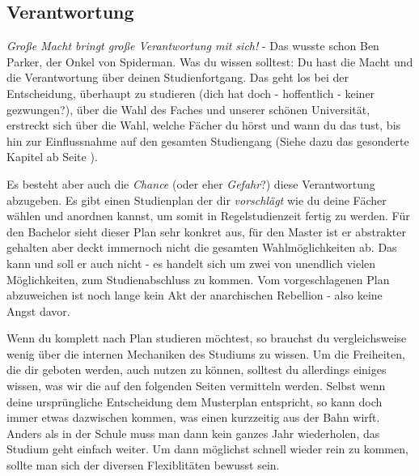 \subsection{Verantwortung}
\textit{Große Macht bringt große Verantwortung mit sich!} - Das wusste schon Ben Parker, der Onkel von Spiderman. Was du wissen solltest: Du hast die Macht und die Verantwortung über deinen Studienfortgang. Das geht los bei der Entscheidung, überhaupt zu studieren (dich hat doch - hoffentlich - keiner gezwungen?), über die Wahl des Faches und unserer schönen Universität, erstreckt sich über die Wahl, welche Fächer du hörst und wann du das tust, bis hin zur Einflussnahme auf den gesamten Studiengang (Siehe dazu das gesonderte Kapitel ab Seite \pageref{politik}).

Es besteht aber auch die \textit{Chance} (oder eher \textit{Gefahr}?) diese Verantwortung abzugeben. Es gibt einen Studienplan der dir \textit{vorschlägt} wie du deine Fächer wählen und anordnen kannst, um somit in Regelstudienzeit fertig zu werden. Für den Bachelor sieht dieser Plan sehr konkret aus, für den Master ist er abstrakter gehalten aber deckt immernoch nicht die gesamten Wahlmöglichkeiten ab. Das kann und soll er auch nicht - es handelt sich um zwei von unendlich vielen Möglichkeiten, zum Studienabschluss zu kommen. Vom vorgeschlagenen Plan abzuweichen ist noch lange kein Akt der anarchischen Rebellion - also keine Angst davor.

Wenn du komplett nach Plan studieren möchtest, so brauchst du vergleichsweise wenig über die internen Mechaniken des Studiums zu wissen. Um die Freiheiten, die dir geboten werden, auch nutzen zu können, solltest du allerdings einiges wissen, was wir die auf den folgenden Seiten vermitteln werden. Selbst wenn deine ursprüngliche Entscheidung dem Musterplan entspricht, so kann doch immer etwas dazwischen kommen, was einen kurzzeitig aus der Bahn wirft. Anders als in der Schule muss man dann kein ganzes Jahr wiederholen, das Studium geht einfach weiter. Um dann möglichst schnell wieder rein zu kommen, sollte man sich der diversen Flexiblitäten bewusst sein.